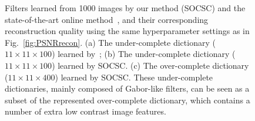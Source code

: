 \begin{figure}[h]
\begin{minipage}{1\textwidth}
    \centering
\end{minipage}
\caption{Filters learned from 1000 images by our method (SOCSC) and the state-of-the-art online method~\cite{liu-2018-first}, and their corresponding reconstruction quality using the same hyperparameter settings as in Fig.\ \ref{fig:PSNRrecon}. (a) The under-complete dictionary ($11 \times 11 \times 100$) learned by~\cite{liu-2018-first}; (b) The under-complete dictionary ($11 \times 11 \times 100$) learned by SOCSC. (c) The over-complete dictionary ($11 \times 11 \times 400$) learned by SOCSC. These under-complete dictionaries, mainly composed of Gabor-like filters, can be seen as a subset of the represented over-complete dictionary, which contains a number of extra low contrast image features.}
\label{fig:overCompleteDic}
\end{figure}

